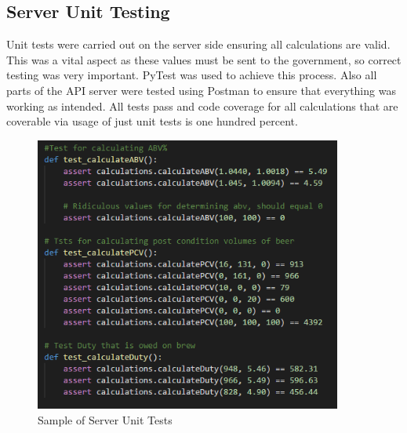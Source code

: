 \subsection{Server Unit Testing}
Unit tests were carried out on the server side ensuring all calculations are valid. This was a vital aspect as these values must be sent to the government, so correct testing was very important. PyTest was used to achieve this process. Also all parts of the API server were tested using Postman to ensure that everything was working as intended.  All tests pass and code coverage for all calculations that are coverable via usage of just unit tests is one hundred percent.
\begin{figure}[h!]
 	\caption{Sample of Server Unit Tests}
	\label{image:unittests}
 	\centering
 	\includegraphics[width=0.9\textwidth]{Images/unittesting.PNG}
\end{figure}
\newpage

